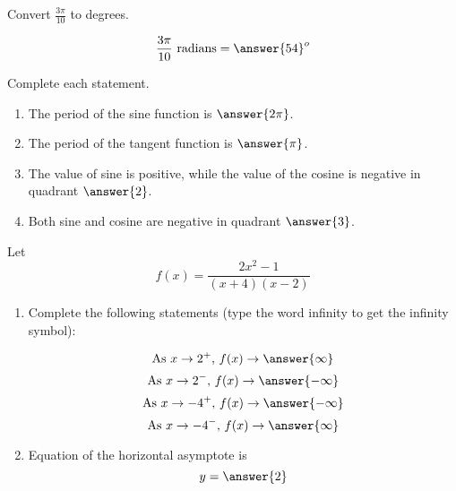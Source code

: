 \documentclass{ximera}
\begin{document}
\begin{problem}\label{prob:160finalprob6}
Convert $\frac{3\pi}{10}$ to degrees.

$$\frac{3\pi}{10}\mbox{ radians}=\answer{54}^o$$
\end{problem}

\begin{problem}\label{prob:160finalprob7}
Complete each statement.
\begin{enumerate}
    \item The period of the sine function is $\answer{2\pi}$.
    \item The period of the tangent function is $\answer{\pi}$.
    \item The value of sine is positive, while the value of the cosine is negative in quadrant $\answer{2}$.
    \item Both sine and cosine are negative in quadrant $\answer{3}$.
\end{enumerate}
\end{problem}

\begin{problem}\label{prob:160finalprob8}
Let $$f(x)=\frac{2x^2-1}{(x+4)(x-2)}$$
\begin{enumerate}
\item Complete the following statements (type the word infinity to get the infinity symbol):

$$\mbox{As }x\rightarrow 2^+,\, f(x)\rightarrow \answer{\infty}$$ 
$$\mbox{As }x\rightarrow 2^-,\, f(x)\rightarrow \answer{-\infty}$$ 
$$\mbox{As }x\rightarrow -4^+,\, f(x)\rightarrow \answer{-\infty}$$ 
$$\mbox{As }x\rightarrow -4^-,\, f(x)\rightarrow \answer{\infty}$$ 
\item Equation of the horizontal asymptote is
$$y=\answer{2}$$

\end{enumerate}

\end{problem}

 
 
\end{document}
